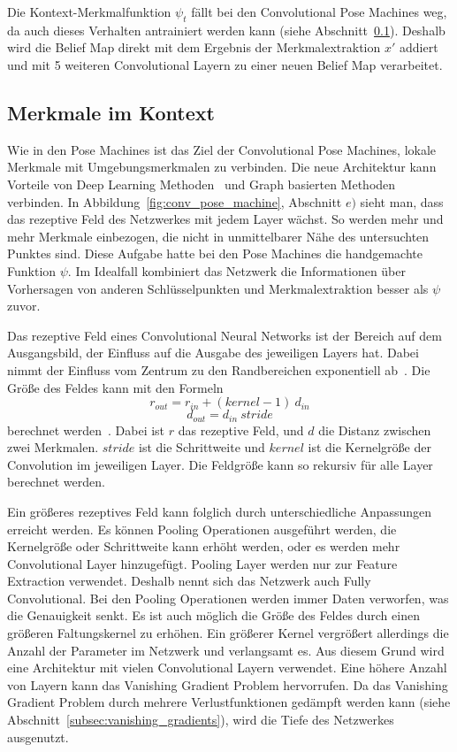 \documentclass[journal, a4paper]{IEEEtran}
\begin{document}
        Die Kontext-Merkmalfunktion $\psi_t$ fällt bei den Convolutional Pose Machines weg, da auch dieses Verhalten antrainiert werden kann (siehe Abschnitt~\ref{subsec:kontext}). Deshalb wird die Belief Map direkt mit dem Ergebnis der Merkmalextraktion $x'$ addiert und mit 5 weiteren Convolutional Layern zu einer neuen Belief Map verarbeitet. 

\subsection{Merkmale im Kontext}\label{subsec:kontext}
        Wie in den Pose Machines ist das Ziel der Convolutional Pose Machines, lokale Merkmale mit Umgebungsmerkmalen zu verbinden. Die neue Architektur kann Vorteile von Deep Learning Methoden~\cite{toshev2014deeppose} und Graph basierten Methoden~\cite{andriluka2009pictorial,LanWM11} verbinden. %
        In Abbildung~\ref{fig:conv_pose_machine}, Abschnitt $e)$ sieht man, dass das rezeptive Feld des Netzwerkes mit jedem Layer wächst. So werden mehr und mehr Merkmale einbezogen, die nicht in unmittelbarer Nähe des untersuchten Punktes sind. Diese Aufgabe hatte bei den Pose Machines die handgemachte Funktion $\psi$. Im Idealfall kombiniert das Netzwerk die Informationen über Vorhersagen von anderen Schlüsselpunkten und Merkmalextraktion besser als $\psi$ zuvor.

        Das rezeptive Feld eines Convolutional Neural Networks ist der Bereich auf dem Ausgangsbild, der Einfluss auf die Ausgabe des jeweiligen Layers hat. Dabei nimmt der Einfluss vom Zentrum zu den Randbereichen exponentiell ab~\cite{dumoulin2016guide}. 
        Die Größe des Feldes kann mit den Formeln
        \[ r_{out} = r_{in} + (kernel-1) \: d_{in}\]
        \[ d_{out} = d_{in} \: stride\]
        berechnet werden~\cite{dumoulin2016guide}.
        Dabei ist $r$ das rezeptive Feld, und $d$ die Distanz zwischen zwei Merkmalen. $stride$ ist die Schrittweite und $kernel$ ist die Kernelgröße der Convolution im jeweiligen Layer. Die Feldgröße kann so rekursiv für alle Layer berechnet werden.
        

        Ein größeres rezeptives Feld kann folglich durch unterschiedliche Anpassungen erreicht werden. Es können Pooling Operationen ausgeführt werden, die Kernelgröße oder Schrittweite kann erhöht werden, oder es werden mehr Convolutional Layer hinzugefügt.
        Pooling Layer werden nur zur Feature Extraction verwendet. Deshalb nennt sich das Netzwerk auch Fully Convolutional. Bei den Pooling Operationen werden immer Daten verworfen, was die Genauigkeit senkt.
        Es ist auch möglich die Größe des Feldes durch einen größeren Faltungskernel zu erhöhen. Ein größerer Kernel vergrößert allerdings die Anzahl der Parameter im Netzwerk und verlangsamt es. 
        Aus diesem Grund wird eine Architektur mit vielen Convolutional Layern verwendet. Eine höhere Anzahl von Layern kann das Vanishing Gradient Problem hervorrufen. Da das Vanishing Gradient Problem durch mehrere Verlustfunktionen gedämpft werden kann (siehe Abschnitt~\ref{subsec:vanishing_gradients}), wird die Tiefe des Netzwerkes ausgenutzt. 
\end{document}
